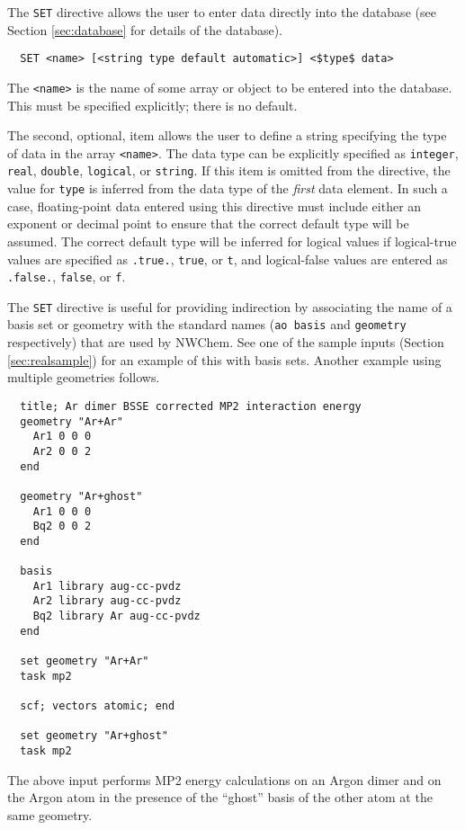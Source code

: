 The \verb+SET+ directive allows the user to enter data directly into the
database (see Section \ref{sec:database} for details of the database).

\begin{verbatim}
  SET <name> [<string type default automatic>] <$type$ data>
\end{verbatim}

The \verb+<name>+ is the name of some array or object to be entered
into the database.  This must be specified explicitly; there is no
default.

The second, optional, item allows the user to define a string
specifying the type of data in the array \verb+<name>+.  The data type
can be explicitly specified as \verb+integer+, \verb+real+,
\verb+double+, \verb+logical+, or \verb+string+.  If this item is
omitted from the directive, the value for \verb+type+ is inferred from
the data type of the {\em first} data element.  In such a case,
floating-point data entered using this directive must include either
an exponent or decimal point to ensure that the correct default type
will be assumed.  The correct default type will be inferred for
logical values if logical-true values are specified as \verb+.true.+,
\verb+true+, or \verb+t+, and logical-false values are entered as
\verb+.false.+, \verb+false+, or \verb+f+.

The \verb+SET+ directive is useful for providing indirection by 
associating the name of a basis set or geometry with the standard
names (\verb+ao basis+ and \verb+geometry+ respectively) that are used
by NWChem.  See one of the sample inputs (Section \ref{sec:realsample}) for
an example of this with basis sets.  Another example using multiple geometries
 follows.

\begin{verbatim}
  title; Ar dimer BSSE corrected MP2 interaction energy
  geometry "Ar+Ar"
    Ar1 0 0 0
    Ar2 0 0 2
  end

  geometry "Ar+ghost"
    Ar1 0 0 0
    Bq2 0 0 2
  end

  basis
    Ar1 library aug-cc-pvdz
    Ar2 library aug-cc-pvdz
    Bq2 library Ar aug-cc-pvdz
  end

  set geometry "Ar+Ar"
  task mp2 

  scf; vectors atomic; end

  set geometry "Ar+ghost"
  task mp2 
\end{verbatim}

The above input performs MP2 energy calculations on an Argon dimer and
on the Argon atom in the presence of the ``ghost'' basis of the other
atom at the same geometry.

